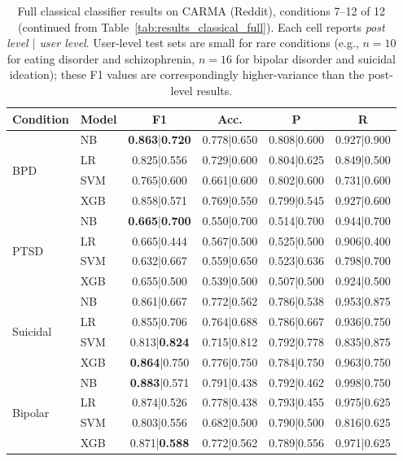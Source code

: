 \documentclass[letterpaper]{article} %
\begin{document}
\begin{table}[t]
\centering
\footnotesize
\setlength{\tabcolsep}{4pt}
\caption{Full classical classifier results on CARMA (Reddit), conditions 7--12 of 12 (continued from Table~\ref{tab:results_classical_full}). Each cell reports \textit{post level $|$ user level}. User-level test sets are small for rare conditions (e.g., $n{=}10$ for eating disorder and schizophrenia, $n{=}16$ for bipolar disorder and suicidal ideation); these F1 values are correspondingly higher-variance than the post-level results.}
\label{tab:results_classical_full2}
\begin{tabular}{llcccc}
\toprule
\textbf{Condition} & \textbf{Model} & \textbf{F1} & \textbf{Acc.} & \textbf{P} & \textbf{R} \\
\midrule
\multirow{4}{*}{BPD}
 & NB & \textbf{0.863}|\textbf{0.720} & 0.778|0.650 & 0.808|0.600 & 0.927|0.900 \\
 & LR & 0.825|0.556 & 0.729|0.600 & 0.804|0.625 & 0.849|0.500 \\
 & SVM & 0.765|0.600 & 0.661|0.600 & 0.802|0.600 & 0.731|0.600 \\
 & XGB & 0.858|0.571 & 0.769|0.550 & 0.799|0.545 & 0.927|0.600 \\
\midrule
\multirow{4}{*}{PTSD}
 & NB & \textbf{0.665}|\textbf{0.700} & 0.550|0.700 & 0.514|0.700 & 0.944|0.700 \\
 & LR & 0.665|0.444 & 0.567|0.500 & 0.525|0.500 & 0.906|0.400 \\
 & SVM & 0.632|0.667 & 0.559|0.650 & 0.523|0.636 & 0.798|0.700 \\
 & XGB & 0.655|0.500 & 0.539|0.500 & 0.507|0.500 & 0.924|0.500 \\
\midrule
\multirow{4}{*}{Suicidal}
 & NB & 0.861|0.667 & 0.772|0.562 & 0.786|0.538 & 0.953|0.875 \\
 & LR & 0.855|0.706 & 0.764|0.688 & 0.786|0.667 & 0.936|0.750 \\
 & SVM & 0.813|\textbf{0.824} & 0.715|0.812 & 0.792|0.778 & 0.835|0.875 \\
 & XGB & \textbf{0.864}|0.750 & 0.776|0.750 & 0.784|0.750 & 0.963|0.750 \\
\midrule
\multirow{4}{*}{Bipolar}
 & NB & \textbf{0.883}|0.571 & 0.791|0.438 & 0.792|0.462 & 0.998|0.750 \\
 & LR & 0.874|0.526 & 0.778|0.438 & 0.793|0.455 & 0.975|0.625 \\
 & SVM & 0.803|0.556 & 0.682|0.500 & 0.790|0.500 & 0.816|0.625 \\
 & XGB & 0.871|\textbf{0.588} & 0.772|0.562 & 0.789|0.556 & 0.971|0.625 \\

\end{tabular}
\end{table}
\end{document}
